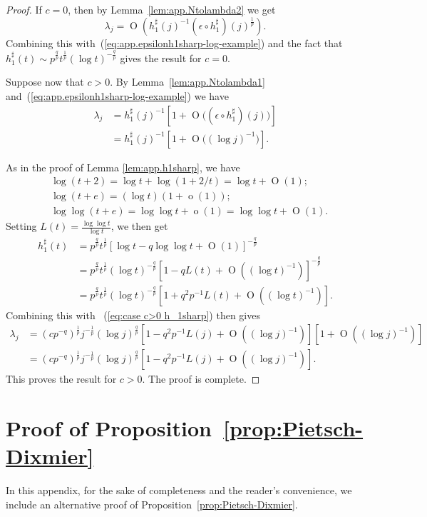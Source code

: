 \documentclass[10pt, a4paper]{amsart}
\newcommand{\op}{\operatorname}
\numberwithin{equation}{section}
\theoremstyle{definition}
\theoremstyle{remark}
\begin{document}
 \begin{proof}
If $c=0$, then by Lemma~\ref{lem:app.Ntolambda2} we get
\begin{equation}\label{eq:case c=0 h_1sharp}
\lambda_j=\op{O}\left( h_1^\sharp(j)^{-1}(\epsilon \circ h_1^\sharp)(j)^{\frac1{p}}\right).
\end{equation}
Combining this with~(\ref{eq:app.epsilonh1sharp-log-example})  and the fact that $h_1^\sharp(t)\sim p^{\frac{q}{p}} t^{\frac{1}{p}}(\log t)^{-\frac{q}{p}}$ gives the result for $c=0$. 

Suppose now that $c>0$. By Lemma~\ref{lem:app.Ntolambda1}  and~(\ref{eq:app.epsilonh1sharp-log-example}) we have
\begin{align}\label{eq:case c>0 h_1sharp}
\lambda_j &=h_1^\sharp(j)^{-1}\left[1+\op{O}\big((\epsilon \circ h_1^\sharp)(j)\big)\right] \\
& = h_1^\sharp(j)^{-1}\left[1+\op{O}\big((\log j)^{-1}\big)\right]. 
\end{align}

As in the proof of Lemma \ref{lem:app.h1sharp}, we have
\begin{align*}
&\log(t+2)=\log t+\log(1+2/t)=\log t+\op{O}(1);\\
&\log(t+e)=(\log t)(1+\op{o}(1));\\
&\log\log(t+e)=\log\log t+\op{o}(1)=\log\log t+\op{O}(1).
\end{align*}
Setting $L(t)=\frac{\log\log t}{\log t}$, we then get
\begin{align*} h_1^\sharp(t)&= p^{\frac{q}{p}}t^{\frac1p}[\log t-q\log\log t+\op{O}(1)]^{-\frac{q}{p}}\\
&=p^{\frac{q}{p}}t^{\frac1p}(\log t)^{-\frac{q}{p}}[1-qL(t) +\op{O}((\log t)^{-1})]^{-\frac{q}{p}}\\
&=p^{\frac{q}{p}}t^{\frac1p}(\log t)^{-\frac{q}{p}}[1+q^2p^{-1}L(t) +\op{O}((\log t)^{-1})].
\end{align*}
Combining this with ~(\ref{eq:case c>0 h_1sharp}) then gives
\begin{align*}
\lambda_j&=(cp^{-q})^{\frac1p}j^{-\frac1p}(\log j)^{\frac{q}{p}}[1-q^2p^{-1}L(j) +\op{O}((\log j)^{-1})][1+\op{O}((\log j)^{-1})]\\
&=(cp^{-q})^{\frac1p}j^{-\frac1p}(\log j)^{\frac{q}{p}}[1-q^2p^{-1}L(j) +\op{O}((\log j)^{-1})].
\end{align*}
This proves the result for $c>0$. The proof is complete.
\end{proof}

\section{Proof of Proposition~\ref{prop:Pietsch-Dixmier}}\label{app:proof-Pietsch-Dixmier}
In this appendix, for the sake of completeness and the reader's convenience, we include an alternative proof of Proposition~\ref{prop:Pietsch-Dixmier}.
\end{document}
